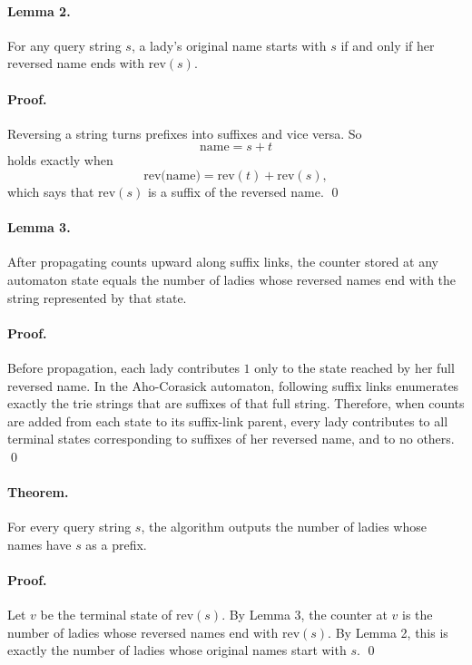 \documentclass[11pt]{article}
\begin{document}
\paragraph{Lemma 2.}
For any query string $s$, a lady's original name starts with $s$ if and only if her reversed name ends with $\text{rev}(s)$.

\paragraph{Proof.}
Reversing a string turns prefixes into suffixes and vice versa. So
\[
\text{name} = s + t
\]
holds exactly when
\[
\text{rev(name)} = \text{rev}(t) + \text{rev}(s),
\]
which says that $\text{rev}(s)$ is a suffix of the reversed name. \qed

\paragraph{Lemma 3.}
After propagating counts upward along suffix links, the counter stored at any automaton state equals the number of ladies whose reversed names end with the string represented by that state.

\paragraph{Proof.}
Before propagation, each lady contributes $1$ only to the state reached by her full reversed name. In the Aho-Corasick automaton, following suffix links enumerates exactly the trie strings that are suffixes of that full string. Therefore, when counts are added from each state to its suffix-link parent, every lady contributes to all terminal states corresponding to suffixes of her reversed name, and to no others. \qed

\paragraph{Theorem.}
For every query string $s$, the algorithm outputs the number of ladies whose names have $s$ as a prefix.

\paragraph{Proof.}
Let $v$ be the terminal state of $\text{rev}(s)$. By Lemma 3, the counter at $v$ is the number of ladies whose reversed names end with $\text{rev}(s)$. By Lemma 2, this is exactly the number of ladies whose original names start with $s$. \qed
\end{document}
